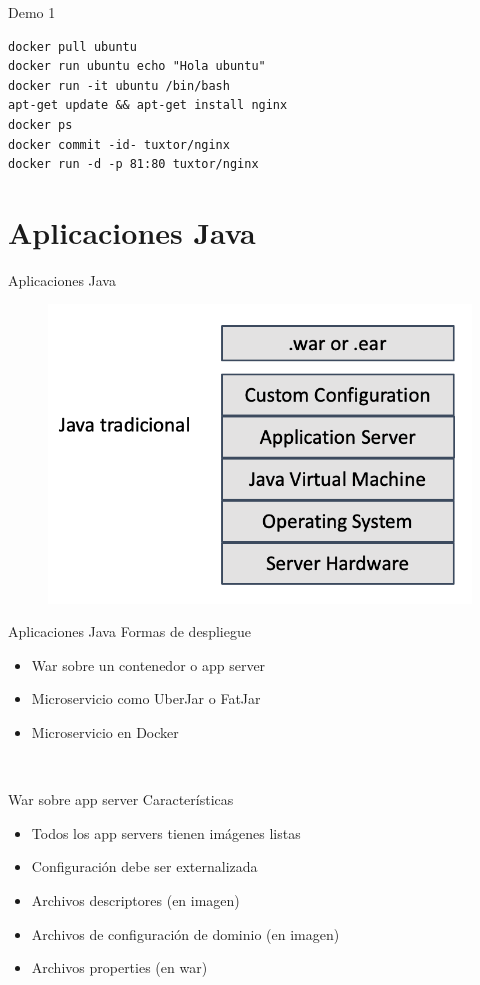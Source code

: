 \documentclass[aspectratio=169]{beamer}
\begin{document}
\begin{frame}[fragile]{Demo 1}
\begin{lstlisting}
docker pull ubuntu
docker run ubuntu echo "Hola ubuntu"
docker run -it ubuntu /bin/bash
apt-get update && apt-get install nginx
docker ps
docker commit -id- tuxtor/nginx
docker run -d -p 81:80 tuxtor/nginx
\end{lstlisting}
\end{frame}


	\section{Aplicaciones Java}



\begin{frame}{Aplicaciones Java}
    \begin{figure}
        \centering
        \includegraphics[width=0.5\linewidth]{Images/javatradicional}
    \end{figure}
\end{frame}

\begin{frame}{Aplicaciones Java}
	Formas de despliegue
    \begin{itemize}
        \item War sobre un contenedor o app server
        \item Microservicio como UberJar o FatJar
        \item Microservicio en Docker
    \end{itemize}
\end{frame} 

\begin{frame}{War sobre app server}
Características
    \begin{itemize}
        \item Todos los app servers tienen imágenes listas
        \item Configuración debe ser externalizada
        \item Archivos descriptores (en imagen)
        \item Archivos de configuración de dominio (en imagen)
        \item Archivos properties (en war)
    \end{itemize}
\end{frame} 
\end{document}
